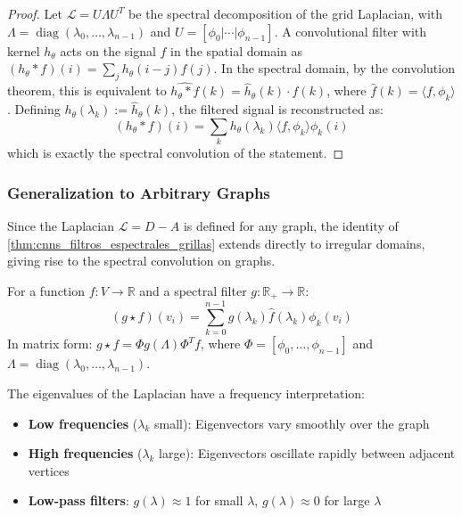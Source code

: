 \begin{proof}
Let $\mathcal{L} = U \Lambda U^T$ be the spectral decomposition of the grid Laplacian, with $\Lambda = \operatorname{diag}(\lambda_0, \ldots, \lambda_{n-1})$ and $U = [\phi_0 | \cdots | \phi_{n-1}]$. A convolutional filter with kernel $h_\theta$ acts on the signal $f$ in the spatial domain as $(h_\theta * f)(i) = \sum_j h_\theta(i-j) f(j)$. In the spectral domain, by the convolution theorem, this is equivalent to $\widehat{h_\theta * f}(k) = \hat{h}_\theta(k) \cdot \hat{f}(k)$, where $\hat{f}(k) = \langle f, \phi_k \rangle$. Defining $h_\theta(\lambda_k) := \hat{h}_\theta(k)$, the filtered signal is reconstructed as:
\[
(h_\theta * f)(i) = \sum_k h_\theta(\lambda_k) \langle f, \phi_k \rangle \phi_k(i)
\]
which is exactly the spectral convolution of the statement.
\end{proof}

\subsubsection{Generalization to Arbitrary Graphs}

Since the Laplacian $\mathcal{L} = D - A$ is defined for any graph, the identity of \autoref{thm:cnns_filtros_espectrales_grillas} extends directly to irregular domains, giving rise to the spectral convolution on graphs.

\begin{definition}\label{def:convolucion_espectral_grafos}
For a function $f: V \to \mathbb{R}$ and a spectral filter $g: \mathbb{R}_+ \to \mathbb{R}$:
\begin{equation}
(g \star f)(v_i) = \sum_{k=0}^{n-1} g(\lambda_k) \hat{f}(\lambda_k) \phi_k(v_i)
\end{equation}
In matrix form: $g \star f = \Phi g(\Lambda) \Phi^T f$, where $\Phi = [\phi_0, \ldots, \phi_{n-1}]$ and $\Lambda = \operatorname{diag}(\lambda_0, \ldots, \lambda_{n-1})$.
\end{definition}

\begin{theorem}\label{thm:interpretacion_frecuencial_grafos}
The eigenvalues of the Laplacian have a frequency interpretation:
\begin{itemize}
    \item \textbf{Low frequencies} ($\lambda_k$ small): Eigenvectors vary smoothly over the graph
    \item \textbf{High frequencies} ($\lambda_k$ large): Eigenvectors oscillate rapidly between adjacent vertices
    \item \textbf{Low-pass filters}: $g(\lambda) \approx 1$ for small $\lambda$, $g(\lambda) \approx 0$ for large $\lambda$
\end{itemize}
\end{theorem}

